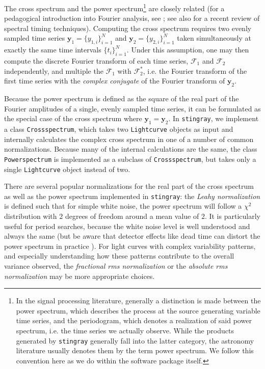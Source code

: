 \documentclass[twocolumn]{aastex62}
\newcommand{\stingray}{\texttt{stingray}\xspace}
\newcommand{\lightcurve}{\texttt{Lightcurve}\xspace}
\newcommand{\crossspectrum}{\texttt{Crossspectrum}\xspace}
\newcommand{\powerspectrum}{\texttt{Powerspectrum}\xspace}
\begin{document}
The cross spectrum and the power spectrum\footnote{In the signal processing literature, generally a distinction is made between the power spectrum, which
describes the process at the source generating variable time series, and the periodogram, which denotes a realization of said power spectrum, i.e. the time series we actually observe. While the products generated by \stingray generally fall into the latter category, the astronomy literature usually denotes them by the term power spectrum. We follow this convention here as we do within the software package itself.} are closely related (for a pedagogical introduction into Fourier analysis, see \citealt{vanderklis1989}; see also \citealt{uttley2014} for a recent review of spectral timing techniques). Computing the cross spectrum requires two evenly sampled time series $\mathbf{y}_1 = \{y_{1,i}\}_{i=1}^{N} $ and $\mathbf{y}_2 =  \{y_{2,i}\}_{i=1}^{N}$ taken simultaneously at exactly the same time intervals $\{t_i \}_{i=1}^N$. Under this assumption, one may then compute the discrete Fourier transform of each time series, $\mathcal{F}_1$ and $\mathcal{F}_2$ independently, and multiple the $\mathcal{F}_1$ with $\mathcal{F}^{*}_2$, i.e. the Fourier transform of the first time series with the \textit{complex conjugate} of the Fourier transform of $\mathbf{y}_2$. 

Because the power spectrum is defined as the square of the real part of the Fourier amplitudes of a single, evenly sampled time series, it can be formulated as the special case of the cross spectrum where $\mathbf{y}_1 = \mathbf{y}_2$. In \stingray, we implement a class \crossspectrum, which takes two \lightcurve objects as input and internally calculates the complex cross spectrum in one of a number of common normalizations.  Because many of the internal calculations are the same, the class \powerspectrum is implemented as a subclass of \crossspectrum, but takes only a single \lightcurve object instead of two. 

There are several popular normalizations for the real part of the cross spectrum as well as the power spectrum implemented in \stingray: the \textit{Leahy normalization} \citep{leahy1983} is defined such that for simple white noise, the power spectrum will follow a $\chi^2$ distribution with $2$ degrees of freedom around a mean value of $2$. It is particularly useful for period searches, because the white noise level is well understood and always the same (but be aware that detector effects like dead time can distort the power spectrum in practice \citep{Bachetti+15}).
For light curves with complex variability patterns, and especially understanding how these patterns contribute to the overall variance observed, the \textit{fractional rms normalization} \citep{belloni1990,miyamoto1992}  or the \textit{absolute rms normalization} \citep{uttley2001} may be more appropriate choices. 
\end{document}
